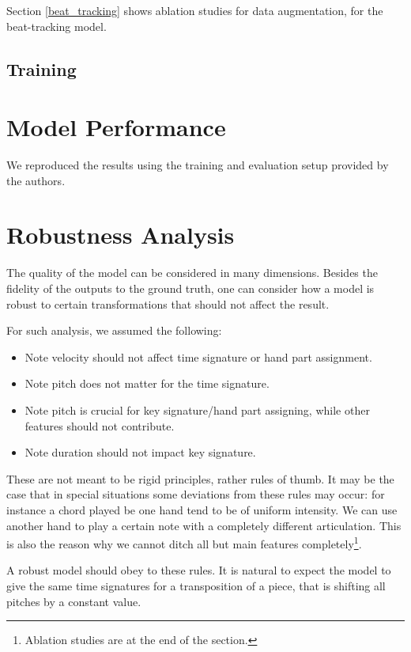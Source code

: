Section \ref{beat_tracking} shows ablation studies for data augmentation, for the beat-tracking model.

\subsection{Training}

\missing

\section{Model Performance}

We reproduced the results using the training and evaluation setup provided by the authors. 

\missing

\section{Robustness Analysis} \label{robustness_analysis}

The quality of the model can be considered in many dimensions. Besides the fidelity of the outputs to the ground truth, one can consider how a model is robust to certain transformations that should not affect the result.

For such analysis, we assumed the following: \begin{itemize}
	\item Note velocity should not affect time signature or hand part assignment.
	\item Note pitch does not matter for the time signature.
	\item Note pitch is crucial for key signature/hand part assigning, while other features should not contribute.
	\item Note duration should not impact key signature.
\end{itemize}

These are not meant to be rigid principles, rather rules of thumb. It may be the case that in special situations some deviations from these rules may occur: for instance a chord played be one hand tend to be of uniform intensity. We can use another hand to play a certain note with a completely different articulation. This is also the reason why we cannot ditch all but main features completely\footnote{Ablation studies are at the end of the section.}.

A robust model should obey to these rules. It is natural to expect the model to give the same time signatures for a transposition of a piece, that is shifting all pitches by a constant value.

